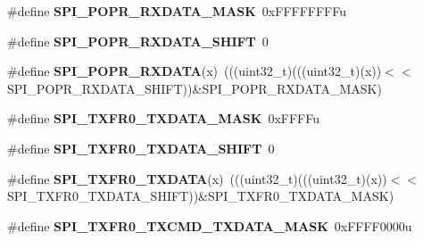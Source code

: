 \begin{DoxyCompactItemize}
\item 
\#define {\bfseries S\+P\+I\+\_\+\+P\+O\+P\+R\+\_\+\+R\+X\+D\+A\+T\+A\+\_\+\+M\+A\+SK}~0x\+F\+F\+F\+F\+F\+F\+F\+Fu\hypertarget{group__SPI__Register__Masks_ga3d2d3998529fd7de17cac99d625fe004}{}\label{group__SPI__Register__Masks_ga3d2d3998529fd7de17cac99d625fe004}

\item 
\#define {\bfseries S\+P\+I\+\_\+\+P\+O\+P\+R\+\_\+\+R\+X\+D\+A\+T\+A\+\_\+\+S\+H\+I\+FT}~0\hypertarget{group__SPI__Register__Masks_ga862819a722e0ccbd3f03edce9b82e5c2}{}\label{group__SPI__Register__Masks_ga862819a722e0ccbd3f03edce9b82e5c2}

\item 
\#define {\bfseries S\+P\+I\+\_\+\+P\+O\+P\+R\+\_\+\+R\+X\+D\+A\+TA}(x)~(((uint32\+\_\+t)(((uint32\+\_\+t)(x))$<$$<$S\+P\+I\+\_\+\+P\+O\+P\+R\+\_\+\+R\+X\+D\+A\+T\+A\+\_\+\+S\+H\+I\+FT))\&S\+P\+I\+\_\+\+P\+O\+P\+R\+\_\+\+R\+X\+D\+A\+T\+A\+\_\+\+M\+A\+SK)\hypertarget{group__SPI__Register__Masks_gae6858b63bc7af767270dafed1e9c5060}{}\label{group__SPI__Register__Masks_gae6858b63bc7af767270dafed1e9c5060}

\item 
\#define {\bfseries S\+P\+I\+\_\+\+T\+X\+F\+R0\+\_\+\+T\+X\+D\+A\+T\+A\+\_\+\+M\+A\+SK}~0x\+F\+F\+F\+Fu\hypertarget{group__SPI__Register__Masks_ga9a231481c0385058731013344776a9f1}{}\label{group__SPI__Register__Masks_ga9a231481c0385058731013344776a9f1}

\item 
\#define {\bfseries S\+P\+I\+\_\+\+T\+X\+F\+R0\+\_\+\+T\+X\+D\+A\+T\+A\+\_\+\+S\+H\+I\+FT}~0\hypertarget{group__SPI__Register__Masks_ga8f072c39e4ee2cddff2444298fc92be0}{}\label{group__SPI__Register__Masks_ga8f072c39e4ee2cddff2444298fc92be0}

\item 
\#define {\bfseries S\+P\+I\+\_\+\+T\+X\+F\+R0\+\_\+\+T\+X\+D\+A\+TA}(x)~(((uint32\+\_\+t)(((uint32\+\_\+t)(x))$<$$<$S\+P\+I\+\_\+\+T\+X\+F\+R0\+\_\+\+T\+X\+D\+A\+T\+A\+\_\+\+S\+H\+I\+FT))\&S\+P\+I\+\_\+\+T\+X\+F\+R0\+\_\+\+T\+X\+D\+A\+T\+A\+\_\+\+M\+A\+SK)\hypertarget{group__SPI__Register__Masks_gae09e375e6cc7f496ac90d900888f7d9c}{}\label{group__SPI__Register__Masks_gae09e375e6cc7f496ac90d900888f7d9c}

\item 
\#define {\bfseries S\+P\+I\+\_\+\+T\+X\+F\+R0\+\_\+\+T\+X\+C\+M\+D\+\_\+\+T\+X\+D\+A\+T\+A\+\_\+\+M\+A\+SK}~0x\+F\+F\+F\+F0000u\hypertarget{group__SPI__Register__Masks_ga2d7e46a45e284b2a837f0dfa4103c9cc}{}\label{group__SPI__Register__Masks_ga2d7e46a45e284b2a837f0dfa4103c9cc}


\end{DoxyCompactItemize}
